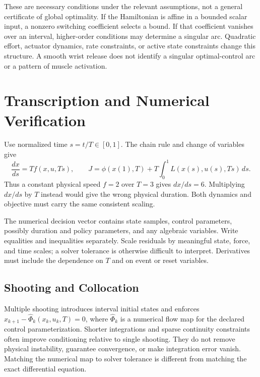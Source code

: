 \documentclass[12pt, openany]{book}
\theoremstyle{plain}
\begin{document}
These are necessary conditions under the relevant assumptions, not a general
certificate of global optimality. If the Hamiltonian is affine in a bounded
scalar input, a nonzero switching coefficient selects a bound. If that
coefficient vanishes over an interval, higher-order conditions may determine
a singular arc. Quadratic effort, actuator dynamics, rate constraints, or
active state constraints change this structure. A smooth wrist release does
not identify a singular optimal-control arc or a pattern of muscle activation.

\section{Transcription and Numerical Verification}

Use normalized time $s=t/T\in[0,1]$. The chain rule and change of variables give
\begin{equation}\label{eq:normalized_ocp}
 \frac{dx}{ds}=T f(x,u,Ts),\qquad
 J=\phi(x(1),T)+T\int_0^1 L(x(s),u(s),Ts)\,ds.
\end{equation}
Thus a constant physical speed $f=2$ over $T=3$ gives $dx/ds=6$.
Multiplying $dx/ds$ by $T$ instead would give the wrong physical duration.
Both dynamics and objective must carry the same consistent scaling.

The numerical decision vector contains state samples, control parameters,
possibly duration and policy parameters, and any algebraic variables. Write
equalities and inequalities separately. Scale residuals by meaningful state,
force, and time scales; a solver tolerance is otherwise difficult to interpret.
Derivatives must include the dependence on $T$ and on event or reset variables.

\subsection{Shooting and Collocation}

Multiple shooting introduces interval initial states and enforces
$x_{k+1}-\widehat\Phi_k(x_k,u_k,T)=0$, where $\widehat\Phi_k$ is a numerical
flow map for the declared control parameterization. Shorter integrations
and sparse continuity constraints often improve conditioning relative to
single shooting. They do not remove physical instability, guarantee convergence,
or make integration error vanish. Matching the numerical map to solver
tolerance is different from matching the exact differential equation.
\end{document}
